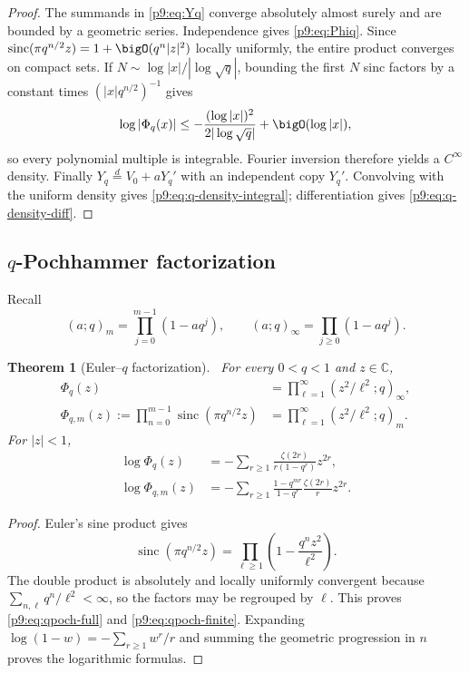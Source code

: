 \documentclass[11pt]{article}
\numberwithin{equation}{section}
\newtheorem{theorem}{Theorem}[section]
\theoremstyle{definition}
\theoremstyle{remark}
\newcommand{\C}{\mathbb C}
\newcommand{\sinc}{\operatorname{sinc}}
\begin{document}
\begin{proof}
The summands in \eqref{p9:eq:Yq} converge absolutely almost surely and are bounded by a
geometric series.  Independence gives \eqref{p9:eq:Phiq}.  Since
$\sinc(\pi q^{n/2}z)=1+\bigO(q^n|z|^2)$ locally uniformly, the entire product converges on
compact sets.  If $N\sim\log|x|/|\log\sqrt q|$, bounding the first $N$ sinc factors by a
constant times $(|x|q^{n/2})^{-1}$ gives
\[
 \log|\Phi_q(x)|\le-\frac{(\log|x|)^2}{2|\log\sqrt q|}+\bigO(\log|x|),
\]
so every polynomial multiple is integrable.  Fourier inversion therefore yields a
$C^\infty$ density.  Finally $Y_q\overset d=V_0+aY_q'$ with an independent copy $Y_q'$.
Convolving with the uniform density gives \eqref{p9:eq:q-density-integral}; differentiation
gives \eqref{p9:eq:q-density-diff}.
\end{proof}

\subsection{$q$-Pochhammer factorization}
Recall
\[
 (a;q)_m=\prod_{j=0}^{m-1}(1-aq^j),\qquad
 (a;q)_\infty=\prod_{j\ge0}(1-aq^j).
\]

\begin{theorem}[Euler--$q$ factorization]\label{p9:thm:qpoch-sinc}
\statusN\ For every $0<q<1$ and $z\in\C$,
\begin{align}
 \Phi_q(z)&=\prod_{\ell=1}^{\infty}(z^2/\ell^2;q)_\infty,  \label{p9:eq:qpoch-full}\\
 \Phi_{q,m}(z):=\prod_{n=0}^{m-1}\sinc(\pi q^{n/2}z)
 &=\prod_{\ell=1}^{\infty}(z^2/\ell^2;q)_m.                \label{p9:eq:qpoch-finite}
\end{align}
For $|z|<1$,
\begin{align}
 \log\Phi_q(z)
 &=-\sum_{r\ge1}\frac{\zeta(2r)}{r(1-q^r)}z^{2r},         \label{p9:eq:q-log-full}\\
 \log\Phi_{q,m}(z)
 &=-\sum_{r\ge1}\frac{1-q^{mr}}{1-q^r}\frac{\zeta(2r)}r z^{2r}. \label{p9:eq:q-log-finite}
\end{align}
\end{theorem}

\begin{proof}
Euler's sine product gives
\[
 \sinc(\pi q^{n/2}z)=\prod_{\ell\ge1}\left(1-\frac{q^nz^2}{\ell^2}\right).
\]
The double product is absolutely and locally uniformly convergent because
$\sum_{n,\ell}q^n/\ell^2<\infty$, so the factors may be regrouped by $\ell$.  This proves
\eqref{p9:eq:qpoch-full} and \eqref{p9:eq:qpoch-finite}.  Expanding
$\log(1-w)=-\sum_{r\ge1}w^r/r$ and summing the geometric progression in $n$ proves the
logarithmic formulas.
\end{proof}
\end{document}
